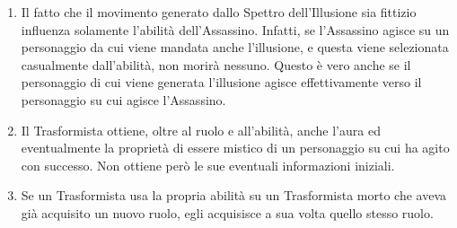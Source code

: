 \documentclass[a4paper,10pt]{article}
\begin{document}
\begin{enumerate}
	\item Il fatto che il movimento generato dallo Spettro dell'Illusione sia fittizio influenza solamente l'abilità dell'Assassino. Infatti, se l'Assassino agisce su un personaggio da cui viene mandata anche l'illusione, e questa viene selezionata casualmente dall'abilità, non morirà nessuno. Questo è vero anche se il personaggio di cui viene generata l'illusione agisce effettivamente verso il personaggio su cui agisce l'Assassino.
	
%	
	
	
	\item Il Trasformista ottiene, oltre al ruolo e all'abilità, anche l'aura ed eventualmente la proprietà di essere mistico di un personaggio su cui ha agito con successo. Non ottiene però le sue eventuali informazioni iniziali.
	
	\item Se un Trasformista usa la propria abilità su un Trasformista morto che aveva già acquisito un nuovo ruolo, egli acquisisce a sua volta quello stesso ruolo. %
	

\end{enumerate}
\end{document}
